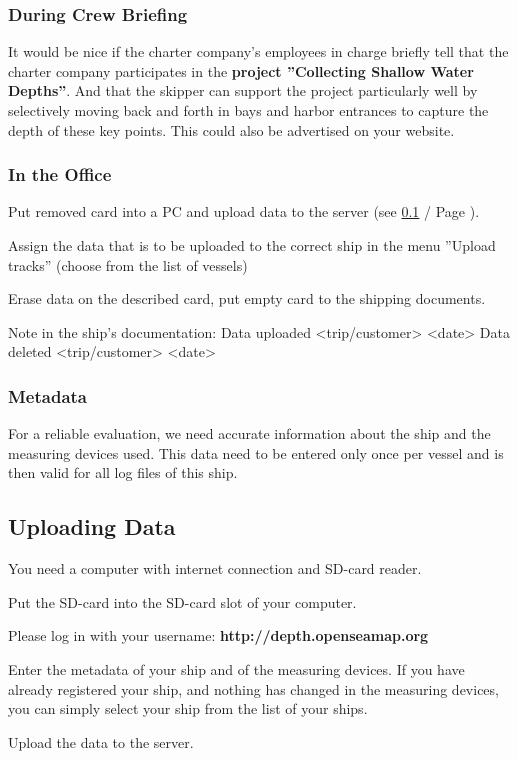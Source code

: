 \documentclass[pdftex, 8pt, paper=130mm:92mm,pagesize]{scrartcl}
\begin{document}
\subsubsection{During Crew Briefing} 

It would be nice if the charter company’s employees in charge briefly tell that the charter company participates in the \textbf{project ''Collecting Shallow Water Depths''}. And that the skipper can support the project particularly well by selectively moving back and forth in bays and harbor entrances to capture the depth of these key points. This could also be advertised on your website. 
\newpage
\subsubsection{In the Office}

\begin{compactenum}
\item Put removed card into a PC and upload data to the server \newline(see \ref{sec:upload}  / Page \pageref{sec:upload}).
\item Assign the data that is to be uploaded to the correct ship in the menu \newline ''Upload tracks'' (choose from the list of vessels)
\item Erase data on the described card, put empty card to the shipping documents.
\item Note in the ship's documentation: \newline Data uploaded <trip/customer> <date> \newline Data deleted <trip/customer> <date> 
\end{compactenum}


\subsubsection{Metadata}

For a reliable evaluation, we need accurate information about the ship and the measuring devices used. This data need to be entered only once per vessel and is then valid for all log files of this ship.

\subsection{Uploading Data}\label{sec:upload}

\begin{compactenum}
\item You need a computer with internet connection and SD-card reader.
\item Put the SD-card into the SD-card slot of your computer.
\item Please log in with your username: \textbf{http://depth.openseamap.org} 
\item Enter the metadata of your ship and of the measuring devices.
If you have already registered your ship, and nothing has changed in the measuring devices, you can simply select your ship from the list of your ships.
\item Upload the data to the server.
\end{compactenum}
\end{document}
